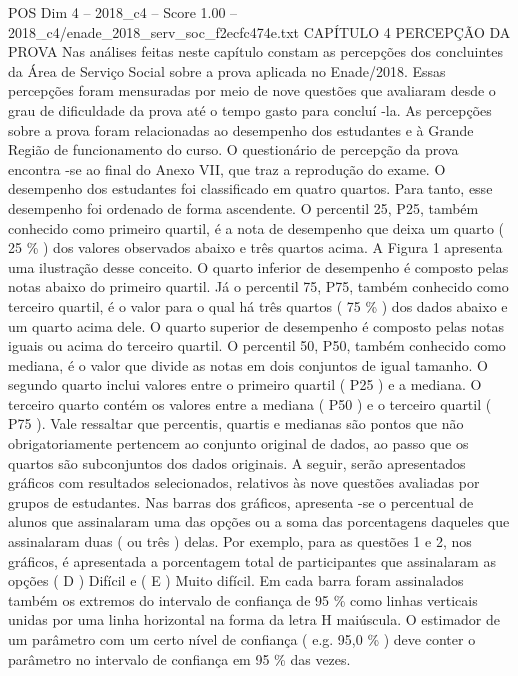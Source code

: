 \begin{textsample}{POS Dim 4 – 2018\_c4 – Score 1.00 – 2018\_c4/enade\_2018\_serv\_soc\_f2ecfc474e.txt}  \label{ex:f4_pos_189}
CAPÍTULO 4 PERCEPÇÃO DA PROVA Nas análises feitas neste capítulo constam as percepções dos concluintes da Área de Serviço Social sobre a prova aplicada no Enade/2018.
Essas percepções foram mensuradas por meio de nove questões que avaliaram desde o grau de dificuldade da prova até o tempo gasto para concluí -la.
As percepções sobre a prova foram relacionadas ao desempenho dos estudantes e à Grande Região de funcionamento do curso.
O questionário de percepção da prova encontra -se ao final do Anexo VII, que traz a reprodução do exame.
O desempenho dos estudantes foi classificado em quatro quartos.
Para tanto, esse desempenho foi ordenado de forma ascendente.
O percentil 25, P25, também conhecido como primeiro quartil, é a nota de desempenho que deixa um quarto ( 25 \% ) dos valores observados abaixo e três quartos acima.
A Figura 1 apresenta uma ilustração desse conceito.
O quarto inferior de desempenho é composto pelas notas abaixo do primeiro quartil.
Já o percentil 75, P75, também conhecido como terceiro quartil, é o valor para o qual há três quartos ( 75 \% ) dos dados abaixo e um quarto acima dele.
O quarto superior de desempenho é composto pelas notas iguais ou acima do terceiro quartil.
O percentil 50, P50, também conhecido como mediana, é o valor que divide as notas em dois conjuntos de igual tamanho.
O segundo quarto inclui valores entre o primeiro quartil ( P25 ) e a mediana.
O terceiro quarto contém os valores entre a mediana ( P50 ) e o terceiro quartil ( P75 ).
Vale ressaltar que percentis, quartis e medianas são pontos que não obrigatoriamente pertencem ao conjunto original de dados, ao passo que os quartos são subconjuntos dos dados originais.
A seguir, serão apresentados gráficos com resultados selecionados, relativos às nove questões avaliadas por grupos de estudantes.
Nas barras dos gráficos, apresenta -se o percentual de alunos que assinalaram uma das opções ou a soma das porcentagens daqueles que assinalaram duas ( ou três ) delas.
Por exemplo, para as questões 1 e 2, nos gráficos, é apresentada a porcentagem total de participantes que assinalaram as opções ( D ) Difícil e ( E ) Muito difícil.
Em cada barra foram assinalados também os extremos do intervalo de confiança de 95 \% como linhas verticais unidas por uma linha horizontal na forma da letra H maiúscula.
O estimador de um parâmetro com um certo nível de confiança ( e.g. 95,0 \% ) deve conter o parâmetro no intervalo de confiança em 95 \% das vezes.

\end{textsample}
